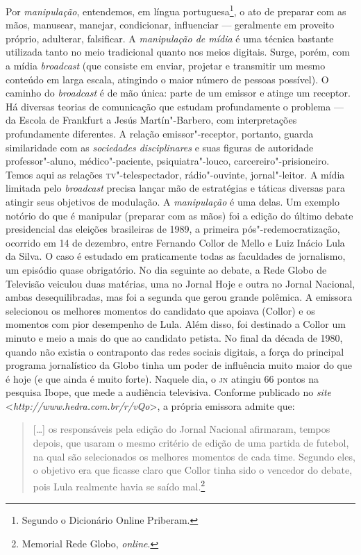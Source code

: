 Por \emph{manipulação}, entendemos, em língua portuguesa\footnote{Segundo o Dicionário Online Priberam.}, o
ato de preparar com as mãos, manusear, manejar, condicionar, influenciar
--- geralmente em proveito próprio, adulterar, falsificar. A
\emph{manipulação de mídia} é uma técnica bastante utilizada tanto no
meio tradicional quanto nos meios digitais. Surge, porém, com a mídia
\emph{broadcast} (que consiste em enviar, projetar e transmitir um mesmo
conteúdo em larga escala, atingindo o maior número de pessoas possível).
O caminho do \emph{broadcast} é de mão única: parte de um emissor e
atinge um receptor. Há diversas teorias de comunicação que estudam
profundamente o problema --- da Escola de Frankfurt a Jesús
Martín"-Barbero, com interpretações profundamente diferentes. A relação
emissor"-receptor, portanto, guarda similaridade com as \emph{sociedades
disciplinares} e suas figuras de autoridade professor"-aluno,
médico"-paciente, psiquiatra"-louco, carcereiro"-prisioneiro. Temos aqui as
relações \textsc{tv}"-telespectador, rádio"-ouvinte, jornal"-leitor. A mídia
limitada pelo \emph{broadcast} precisa lançar mão de estratégias e
táticas diversas para atingir seus objetivos de modulação. A
\emph{manipulação} é uma delas. Um exemplo notório do que é manipular
(preparar com as mãos) foi a edição do último debate presidencial das
eleições brasileiras de 1989, a primeira pós"-redemocratização, ocorrido
em 14 de dezembro, entre Fernando Collor de Mello e Luiz Inácio Lula da
Silva. O caso é estudado em praticamente todas as faculdades de
jornalismo, um episódio quase obrigatório. No dia seguinte ao debate, a
Rede Globo de Televisão veiculou duas matérias, uma no Jornal Hoje e
outra no Jornal Nacional, ambas desequilibradas, mas foi a segunda que
gerou grande polêmica. A emissora selecionou os melhores momentos do
candidato que apoiava (Collor) e os momentos com pior desempenho de Lula. 
Além disso, foi destinado a Collor um minuto e meio a mais do que ao
candidato petista. No final da década de 1980, quando não existia o
contraponto das redes sociais digitais, a força do principal programa
jornalístico da Globo tinha um poder de influência muito maior do que é
hoje (e que ainda é muito forte). Naquele dia, o \textsc{jn} atingiu 66 pontos na
pesquisa Ibope, que mede a audiência televisiva. Conforme publicado no
\emph{site} \textless{}\emph{http://www.hedra.com.br/r/vQo}\textgreater{}, a própria emissora admite que:

\begin{quote}
{[}\ldots{}{]} os responsáveis pela edição do Jornal Nacional afirmaram, tempos
depois, que usaram o mesmo critério de edição de uma partida de futebol,
na qual são selecionados os melhores momentos de cada time. Segundo
eles, o objetivo era que ficasse claro que Collor tinha sido o vencedor
do debate, pois Lula realmente havia se saído mal.\footnote{Memorial Rede Globo,
\emph{online}.}
\end{quote}

